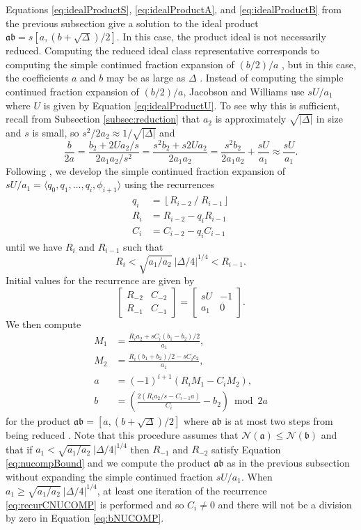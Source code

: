 \documentclass{ucalgthes1}
\theoremstyle{definition}
\newcommand{\matrixtt}[4]{\left[ \begin{array}{rr} #1 & #2 \\ #3 & #4 \end{array} \right]}
\newcommand{\floor}[1]{\left\lfloor #1 \right\rfloor}
\newcommand{\ideal}{\mathfrak}
\begin{document}
Equations \eqref{eq:idealProductS}, \eqref{eq:idealProductA}, and \eqref{eq:idealProductB} from the previous subsection give a solution to the ideal product $\ideal a \ideal b = s[a, (b+\sqrt\Delta)/2]$.  In this case, the product ideal is not necessarily reduced.  Computing the reduced ideal class representative corresponds to computing the simple continued fraction expansion of $(b/2)/a$ \cite[p.119]{Jacobson2009}, but in this case, the coefficients $a$ and $b$ may be as large as $\Delta$ \cite[p.118]{Jacobson2009}.  Instead of computing the simple continued fraction expansion of $(b/2)/a$, Jacobson and Williams \cite[p.119]{Jacobson2009} use $sU/a_1$ where $U$ is given by Equation \eqref{eq:idealProductU}.  To see why this is sufficient, recall from Subsection \ref{subsec:reduction} that $a_2$ is approximately $\sqrt{|\Delta|}$ in size and $s$ is small, so $s^2 / 2 a_2 \approx 1 / \sqrt{|\Delta|}$ and
\[
	\frac{b}{2a} = \frac{b_2 + 2Ua_2/s}{2a_1a_2/s^2} 
	= \frac{s^2 b_2+s2Ua_2}{2a_1a_2}
	= \frac{s^2b_2}{2a_1a_2} + \frac{sU}{a_1}
	\approx \frac{sU}{a_1}.
\]
Following \cite[pp.120-121]{Jacobson2009}, we develop the simple continued fraction expansion of $sU/a_1 = \langle q_0, q_1, \dots, q_i, \phi_{i+1} \rangle$ using the recurrences
\begin{align}
	q_i &= \floor{R_{i-2} ~/~ R_{i-1}} \label{eq:recurqNUCOMP} \\
	R_i &= R_{i-2} - q_i R_{i-1} \label{eq:recurRNUCOMP} \\
	C_i &= C_{i-2} - q_i C_{i-1} \label{eq:recurCNUCOMP}
\end{align}
until we have $R_i$ and $R_{i-1}$ such that
\begin{equation}
\label{eq:nucompBound}
	R_i < \sqrt{a_1/a_2} ~ |\Delta/4|^{1/4} < R_{i-1}.
\end{equation}
Initial values for the recurrence are given by
\[
	\matrixtt{R_{-2}}{C_{-2}}{R_{-1}}{C_{-1}} = \matrixtt{sU}{-1}{a_1}{0}.
\]
We then compute
\begin{align}
	M_1 &= \frac{R_i a_2 + sC_i(b_1-b_2)/2}{a_1}, \nonumber \\
	M_2 &= \frac{R_i (b_1+b_2)/2 - s C_i c_2}{a_1}, \nonumber \\
	a &= (-1)^{i+1} (R_i M_1  - C_i M_2), \nonumber \\
	b &= \left( \frac{2(R_i a_2 /s - C_{i-1} a)}{C_i} - b_2 \right) \bmod 2a \label{eq:bNUCOMP}
\end{align}
for the product $\mathfrak a \mathfrak b = [a, (b + \sqrt\Delta)/2]$ where $\ideal a \ideal b$ is at most two steps from being reduced \cite[p.122]{Jacobson2009}.  Note that this procedure assumes that $\mathcal N(\mathfrak a) \le \mathcal N(\mathfrak b)$ and that if $a_1 < \sqrt{a_1/a_2} ~ |\Delta/4|^{1/4}$ then $R_{-1}$ and $R_{-2}$ satisfy Equation \eqref{eq:nucompBound} and we compute the product $\mathfrak a \mathfrak b$ as in the previous subsection without expanding the simple continued fraction $sU/a_1$.  When $a_1 \ge \sqrt{a_1/a_2} ~ |\Delta/4|^{1/4}$, at least one iteration of the recurrence \eqref{eq:recurCNUCOMP} is performed and so $C_i \neq 0$ and there will not be a division by zero in Equation \eqref{eq:bNUCOMP}.
\end{document}
